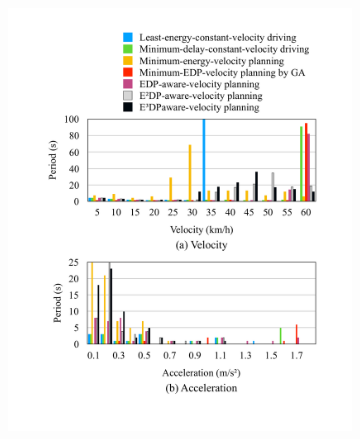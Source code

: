 \documentclass{IEEEtran}
\begin{document}
\begin{figure}   %
\centering
	\begin{subfigure}{0.45\textwidth}
	\includegraphics[width=\hsize]{Figures/Histogram_legend.pdf}
	\end{subfigure}
	\begin{subfigure}{0.5\textwidth}

\end{subfigure}
\end{figure}
\end{document}
